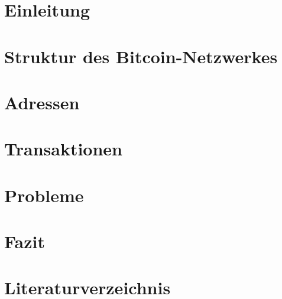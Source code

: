 \documentclass[12pt]{scrartcl}
\begin{document}


\tableofcontents

\section{Einleitung}


\section{Struktur des Bitcoin-Netzwerkes}


\section{Adressen}


\section{Transaktionen}


\section{Probleme}


\section{Fazit}


\section*{Literaturverzeichnis}
\newpage
{}
\printbibliography
\end{document}
